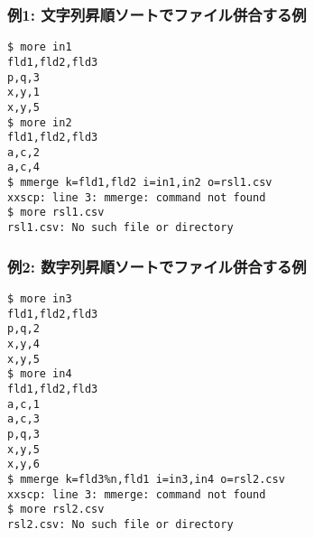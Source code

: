 \subsubsection*{例1: 文字列昇順ソートでファイル併合する例}



\begin{Verbatim}[baselinestretch=0.7,frame=single]
$ more in1
fld1,fld2,fld3
p,q,3
x,y,1
x,y,5
$ more in2
fld1,fld2,fld3
a,c,2
a,c,4
$ mmerge k=fld1,fld2 i=in1,in2 o=rsl1.csv
xxscp: line 3: mmerge: command not found
$ more rsl1.csv
rsl1.csv: No such file or directory
\end{Verbatim}
\subsubsection*{例2: 数字列昇順ソートでファイル併合する例}



\begin{Verbatim}[baselinestretch=0.7,frame=single]
$ more in3
fld1,fld2,fld3
p,q,2
x,y,4
x,y,5
$ more in4
fld1,fld2,fld3
a,c,1
a,c,3
p,q,3
x,y,5
x,y,6
$ mmerge k=fld3%n,fld1 i=in3,in4 o=rsl2.csv
xxscp: line 3: mmerge: command not found
$ more rsl2.csv
rsl2.csv: No such file or directory
\end{Verbatim}
